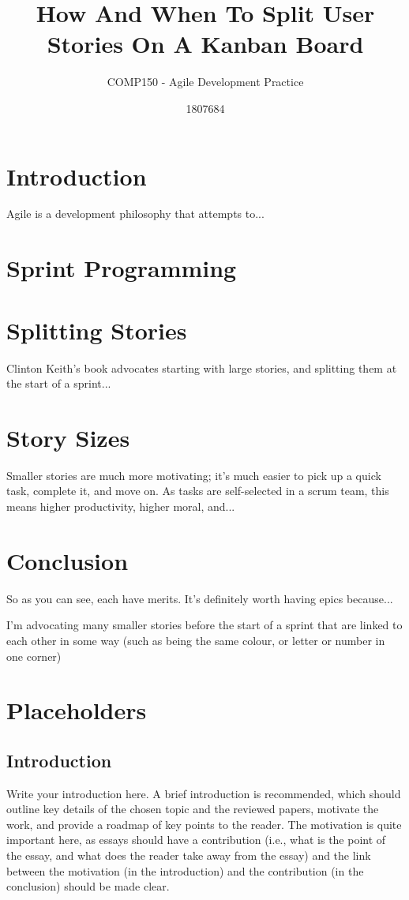 \documentclass{scrartcl}
\title{How And When To Split User Stories On A Kanban Board}
\subtitle{COMP150 - Agile Development Practice}
\author{1807684}
\begin{document}
\maketitle


\section{Introduction}
Agile is a development philosophy that attempts to...%

\section{Sprint Programming}


\section{Splitting Stories}
Clinton Keith's book \cite{Keith} advocates starting with large stories, and splitting them at the start of a sprint...%

\section{Story Sizes}
Smaller stories are much more motivating; it's much easier to pick up a quick task, complete it, and move on. As tasks are self-selected in a scrum team, this means higher productivity, higher moral, and...%

\section{Conclusion}
So as you can see, each have merits. It's definitely worth having epics because...%

I'm advocating many smaller stories before the start of a sprint that are linked to each other in some way (such as being the same colour, or letter or number in one corner)

\section{Placeholders}
\subsection{Introduction}
Write your introduction here. A brief introduction is recommended, which should outline key details of the chosen topic and the reviewed papers, motivate the work, and provide a roadmap of key points to the reader. The motivation is quite important here, as essays should have a contribution (i.e., what is the point of the essay, and what does the reader take away from the essay) and the link between the motivation (in the introduction) and the contribution (in the conclusion) should be made clear.
\end{document}

